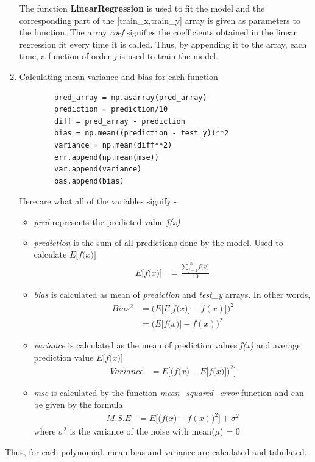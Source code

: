 \documentclass[11pt]{article}
\begin{document}
\begin{enumerate}
\begin{lstlisting}
		\end{lstlisting}
		The function \textbf{LinearRegression} is used to fit the model and the
		corresponding part of the [train\_x,train\_y] array is given as parameters to
		the function.
		The array \textit{coef} signifies the coefficients obtained in the linear
		regression fit every time it is called. Thus, by appending it to the array, each
		time, a function of order \textit{j} is used to train the model.
		
		\item Calculating mean variance and bias for each function
		\begin{lstlisting}
		pred_array = np.asarray(pred_array)
		prediction = prediction/10
		diff = pred_array - prediction
		bias = np.mean((prediction - test_y))**2
		variance = np.mean(diff**2)
		err.append(np.mean(mse))
		var.append(variance)
		bas.append(bias)
		\end{lstlisting}
		Here are what all of the variables signify - 
		\begin{itemize}
			\item \textit{pred} represents the predicted value \textit{\^{f}(x)}
			\item \textit{prediction} is the sum of all predictions done by the model.
			Used to calculate
			$E\big[\textit{\^{f}(x)}\big]$
			\begin{align*}
			E\big[\textit{\^{f}(x)}\big] &= \frac{\sum_{j=1}^{10}\textit{\^{f}(x)}}{10}
			\end{align*}
			\item \textit{bias} is calculated as mean of \textit{prediction} and
			\textit{test\_y} arrays.
			In other words,
			\begin{align*}
			Bias^2 &= \bigg(E\bigg[E\big[\textit{\^{f}(x)}\big]-f(x)\bigg]\bigg)^2 \\
			&= \bigg(E\big[\textit{\^{f}(x)}\big]-f(x)\bigg)^2
			\end{align*}
			\item \textit{variance} is calculated as the mean of prediction values
			\textit{\^{f}(x)} and average prediction value $E\big[\textit{\^{f}(x)}\big]$
			\begin{align*}
			Variance &=
			E\bigg[\big(\textit{\^{f}(x)}-E\big[\textit{\^{f}(x)}\big]\big)^2\bigg]
			\end{align*}
			\item \textit{mse} is calculated by the function
			\textit{mean\_squared\_error} function and can be given by the formula
			\begin{align*}
			M.S.E &= E\big[\big(\textit{\^{f}(x)}-f(x)\big)^2\big] + \sigma^{2}
			\end{align*}
			where $\sigma^{2}$ is the variance of the noise with mean($\mu$) = 0
		\end{itemize}
	\end{enumerate}
	Thus, for each polynomial, mean bias and variance are calculated and tabulated. 
	
\end{document}
